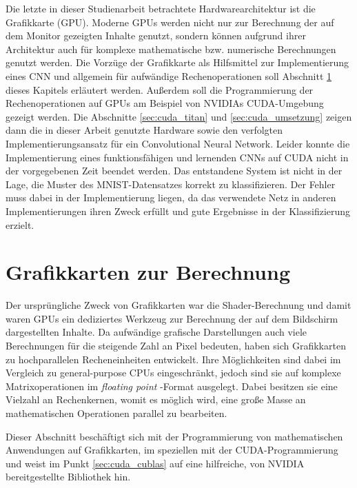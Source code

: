 \documentclass[../main.tex]{subfiles}
\begin{document}
	Die letzte in dieser Studienarbeit betrachtete Hardwarearchitektur ist die Grafikkarte (GPU). Moderne GPUs werden nicht nur zur Berechnung der auf dem Monitor gezeigten Inhalte genutzt, sondern können aufgrund ihrer Architektur auch für komplexe mathematische bzw. numerische Berechnungen genutzt werden. Die Vorzüge der Grafikkarte als Hilfsmittel zur Implementierung eines CNN und allgemein für aufwändige Rechenoperationen soll Abschnitt \ref{sec:cuda_berechnung} dieses Kapitels erläutert werden. Außerdem soll die Programmierung der Rechenoperationen auf GPUs am Beispiel von NVIDIAs CUDA-Umgebung gezeigt werden. Die Abschnitte \ref{sec:cuda_titan}  und \ref{sec:cuda_umsetzung}  zeigen dann die in dieser Arbeit genutzte Hardware sowie den verfolgten Implementierungsansatz für ein Convolutional Neural Network. Leider konnte die Implementierung eines funktionsfähigen und lernenden CNNs auf CUDA nicht in der vorgegebenen Zeit beendet werden. Das entstandene System ist nicht in der Lage, die Muster des MNIST-Datensatzes korrekt zu klassifizieren. Der Fehler muss dabei in der Implementierung liegen, da das verwendete Netz in anderen Implementierungen ihren Zweck erfüllt und gute Ergebnisse in der Klassifizierung erzielt.
\section{Grafikkarten zur Berechnung} \label{sec:cuda_berechnung}
Der ursprüngliche Zweck von Grafikkarten war die Shader-Berechnung und damit waren GPUs ein dediziertes Werkzeug zur Berechnung der auf dem Bildschirm dargestellten Inhalte. Da aufwändige grafische Darstellungen auch viele Berechnungen für die steigende Zahl an Pixel bedeuten, haben sich Grafikkarten zu hochparallelen Recheneinheiten entwickelt. Ihre Möglichkeiten sind dabei im Vergleich zu general-purpose CPUs eingeschränkt, jedoch sind sie auf komplexe Matrixoperationen im \emph{floating point} -Format ausgelegt. Dabei besitzen sie eine Vielzahl an Rechenkernen, womit es möglich wird, eine große Masse an mathematischen Operationen parallel zu bearbeiten. \par Dieser Abschnitt beschäftigt sich mit der Programmierung von mathematischen Anwendungen auf Grafikkarten, im speziellen mit der CUDA-Programmierung und weist im Punkt \ref{sec:cuda_cublas} auf eine hilfreiche, von NVIDIA bereitgestellte Bibliothek hin. \par 
\end{document}
